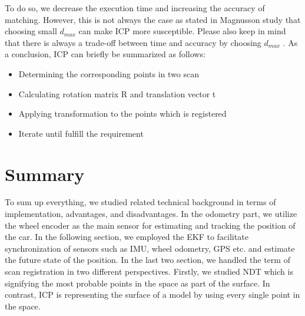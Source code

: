 To do so, we decrease the execution time and increasing the accuracy of matching. However, this is not always the case as stated in Magnusson study \cite{icp2} that choosing small $d_{max}$ can make ICP more susceptible. Please also keep in mind that there is always a trade-off between time and accuracy by choosing $d_{max}$ \cite{icp3}. As a conclusion, ICP can briefly be summarized as follows:
\begin{itemize}
    \item Determining the corresponding points in two scan
    \item Calculating rotation matrix R and translation vector t
    \item Applying transformation to the points which is registered
    \item Iterate until fulfill the requirement
\end{itemize}

\section{Summary}\label{sec:summary}
To sum up everything, we studied related technical background in terms of implementation, advantages, and disadvantages. In the odometry part, we utilize the wheel encoder as the main sensor for estimating and tracking the position of the car. In the following section, we employed the EKF to facilitate synchronization of sensors such as IMU, wheel odometry, GPS etc. and estimate the future state of the position. In the last two section, we handled the term of scan registration in two different perspectives. Firstly, we studied NDT which is signifying the most probable points in the space as part of the surface. In contrast, ICP is representing the surface of a model by using every single point in the space. %